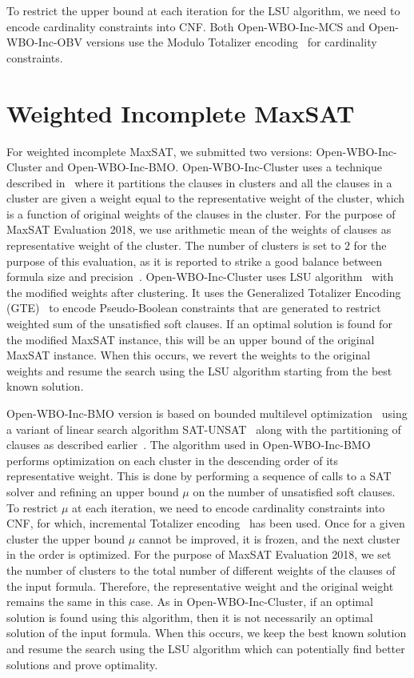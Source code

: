 \documentclass[conference]{IEEEtran}
\newcommand{\mcs}{\textsf{Open-WBO-Inc-MCS}\xspace}
\newcommand{\obv}{\textsf{Open-WBO-Inc-OBV}\xspace}
\newcommand{\weight}{\textsf{Open-WBO-Inc-Cluster}\xspace}
\newcommand{\ml}{\textsf{Open-WBO-Inc-BMO}\xspace}
\begin{document}
To restrict the upper bound at each iteration for the LSU algorithm, we need to encode cardinality constraints into CNF. Both \mcs and \obv versions use the Modulo Totalizer encoding~\cite{totalizer-ictai13} for cardinality constraints.


\section{Weighted Incomplete MaxSAT}

For weighted incomplete MaxSAT, we submitted two versions: \weight and \ml. 
%
\weight uses a technique described in~\cite{cp18} 
where it partitions the clauses in clusters and
all the clauses in a cluster are given a weight equal to the representative
weight of the cluster, which is a function of original
weights of the clauses in the cluster. For the purpose of
MaxSAT Evaluation 2018,
we use arithmetic mean of the weights of clauses as representative weight of the
cluster. The number of clusters is set to $2$ for the purpose of this evaluation,  as it is reported to strike a good balance
between formula size and precision~\cite{cp18}.
%
\weight uses LSU algorithm~\cite{berre-jsat10} with the modified weights after clustering. 
It uses the Generalized Totalizer Encoding
(GTE)~\cite{joshi-cp15} to encode Pseudo-Boolean constraints that
are generated to restrict weighted sum of the unsatisfied soft 
clauses. If an optimal solution is found for the modified MaxSAT instance, this will be an upper bound of the original MaxSAT instance. When this occurs, we revert the weights to the original 
weights and resume the search using the LSU algorithm starting from the best known solution.

\ml version is based on bounded multilevel optimization~\cite{marques-silva-amai11} 
using a variant of linear search algorithm
SAT-UNSAT~\cite{berre-jsat10} along with the partitioning
of clauses as described earlier~\cite{cp18}. The
algorithm used in \ml performs optimization on each cluster
in the descending order of its representative weight. This
is done by performing a sequence of calls to a SAT solver
and refining an upper bound $\mu$ on the number of
unsatisfied soft clauses. To restrict $\mu$ at each
iteration, we need to encode  cardinality constraints into
CNF, for which, incremental Totalizer
encoding~\cite{martins-cp14} has been used. Once for a given
cluster the upper bound $\mu$ cannot be improved, it is
frozen, and the next cluster in the order is optimized. For
the purpose of MaxSAT Evaluation 2018, we set the number of
clusters to the total number of different weights of
the clauses of the input formula. Therefore, the
representative weight and the original weight remains the
same in this case. As in \weight, if an optimal solution is found 
using this algorithm, then it is not necessarily an optimal solution of the 
input formula. When this occurs, we keep the best known solution and resume the search 
using the LSU algorithm which can potentially find better solutions and prove optimality.
\end{document}
